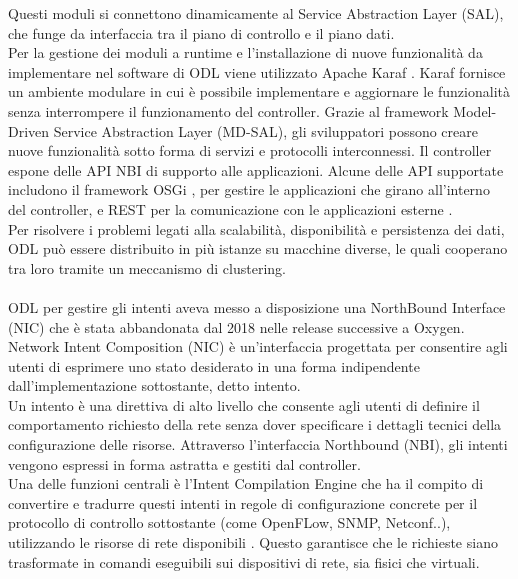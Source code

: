 Questi moduli si connettono dinamicamente al Service Abstraction Layer (SAL), che funge da interfaccia tra il piano di controllo e il piano dati.
\\Per la gestione dei moduli a runtime e l'installazione di nuove funzionalità da implementare nel software di ODL viene utilizzato Apache Karaf \cite{Apache}.
Karaf fornisce un ambiente modulare in cui è possibile implementare e aggiornare le funzionalità senza interrompere il funzionamento del controller.
Grazie al framework Model-Driven Service Abstraction Layer (MD-SAL), gli sviluppatori possono creare nuove funzionalità sotto forma di servizi e protocolli interconnessi.
Il controller espone delle API NBI di supporto alle applicazioni. Alcune delle API supportate includono il framework OSGi \cite{osgi}, per gestire le applicazioni che girano all'interno del controller,
e REST per la comunicazione con le applicazioni esterne \cite{tesiodl2}.
\\Per risolvere i problemi legati alla scalabilità, disponibilità e persistenza dei dati, ODL può essere distribuito in più istanze su macchine diverse, le quali cooperano tra loro tramite un meccanismo di clustering.
\\
\\ODL per gestire gli intenti aveva messo a disposizione una NorthBound Interface (NIC) che è stata abbandonata dal 2018 nelle release successive a Oxygen.
\\Network Intent Composition (NIC) \cite{nic} è un'interfaccia progettata per consentire agli utenti di esprimere uno stato desiderato in una forma indipendente dall'implementazione sottostante, detto intento. 
\\Un intento è una direttiva di alto livello che consente agli utenti di definire il comportamento richiesto della rete senza dover specificare i dettagli tecnici della configurazione delle risorse.
Attraverso l'interfaccia Northbound (NBI), gli intenti vengono espressi in forma astratta e gestiti dal controller.
\\Una delle funzioni centrali è l'Intent Compilation Engine che ha il compito di convertire e tradurre questi intenti in regole di configurazione concrete per il protocollo di controllo sottostante (come OpenFLow, SNMP, Netconf..), utilizzando le risorse di rete disponibili .
Questo garantisce che le richieste siano trasformate in comandi eseguibili sui dispositivi di rete, sia fisici che virtuali.
